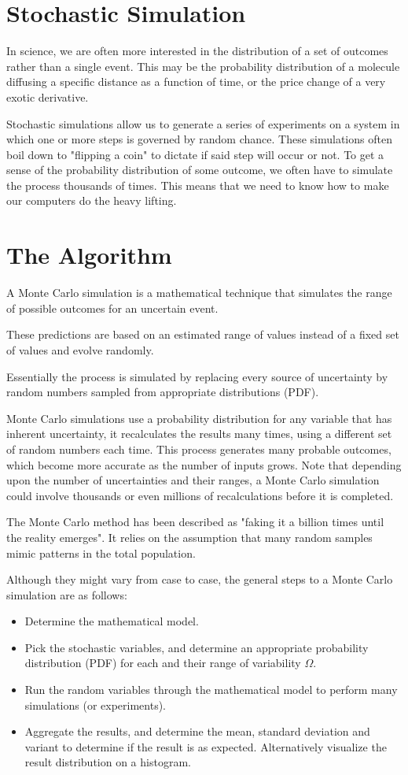 \documentclass[12pt,a4paper]{book}
\begin{document}
\section{Stochastic Simulation}
In science, we are often more interested in the distribution of a set of outcomes rather than a single event. This may be the probability distribution of a molecule diffusing a specific distance as a function of time, or the price change of a very exotic derivative.

Stochastic simulations allow us to generate a series of experiments on a system in which one or more steps is governed by random chance. These simulations often boil down to "flipping a coin" to dictate if said step will occur or not.
To get a sense of the probability distribution of some outcome, we often have to simulate the process thousands of times. This means that we need to know how to make our computers do the heavy lifting.

\section{The Algorithm}
A Monte Carlo simulation is a mathematical technique that simulates the range of possible outcomes for an uncertain event.

These predictions are based on an estimated range of values instead of a fixed set of values and evolve randomly.

Essentially the process is simulated by replacing every source of uncertainty by random numbers sampled from appropriate distributions (PDF). 

Monte Carlo simulations use a probability distribution for any variable that has inherent uncertainty, it recalculates the results many times, using a different set of random numbers each time. This process generates many probable outcomes, which become more accurate as the number of inputs grows.
Note that depending upon the number of uncertainties and their ranges, a Monte Carlo simulation could involve thousands or even millions of recalculations before it is completed.

The Monte Carlo method has been described as "faking it a billion times until the reality emerges". It relies on the assumption that many random samples mimic patterns in the total population.

Although they might vary from case to case, the general steps to a Monte Carlo simulation are as follows:
\begin{itemize}
\item Determine the mathematical model.
\item Pick the stochastic variables, and determine an appropriate probability distribution (PDF) for each and their range of variability $\Omega$.
\item Run the random variables through the mathematical model to perform many simulations (or experiments).
\item Aggregate the results, and determine the mean, standard deviation and variant to determine if the result is as expected. Alternatively visualize the result distribution on a histogram.
\end{itemize}
\end{document}
